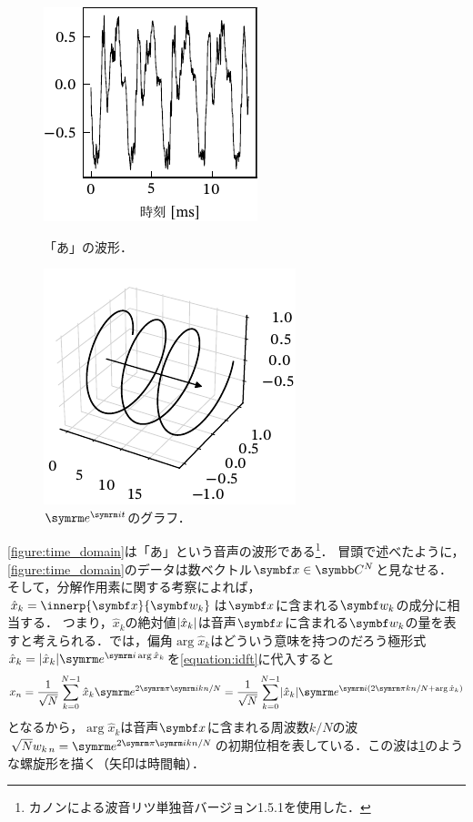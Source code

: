 \documentclass[../../main]{subfiles}
\begin{document}
\begin{figure}[htbp]
  \begin{minipage}{\linewidth/2}
    \centering
    \includegraphics{figures/time_domain.pdf}
    \caption{「あ」の波形．}
    \label{figure:time_domain}
  \end{minipage}%
  \begin{minipage}{\linewidth/2}
    \centering
    \includegraphics{figures/helix.pdf}
    \caption{\(\napr^{\iuni t}\)のグラフ．}
    \label{figure:complex_sinusoid}
  \end{minipage}
\end{figure}

\cref{figure:time_domain}は「あ」という音声の波形である\footnote{カノン\cite{canon}による波音リツ単独音バージョン1.5.1を使用した．}．
冒頭で述べたように，\cref{figure:time_domain}のデータは数ベクトル\(\vect{x}\in\numset{C}^N\)と見なせる．
そして，分解作用素に関する考察によれば，\(\hat{x}_k=\innerp{\vect{x}}{\vect{w}_k}\)は\(\vect{x}\)に含まれる\(\vect{w}_k\)の成分に相当する．
つまり，\(\hat{x}_k\)の絶対値\(\lvert\hat{x}_k\rvert\)は音声\(\vect{x}\)に含まれる\(\vect{w}_k\)の量を表すと考えられる．では，偏角\(\arg\hat{x}_k\)はどういう意味を持つのだろう\？極形式\(\hat{x}_k=\abs{\hat{x}_k}\napr^{\iuni\arg\hat{x}_k}\)を\cref{equation:idft}に代入すると
\[
  x_n = \frac{1}{\sqrt{N}}\sum_{k=0}^{N-1}\hat{x}_k\napr^{2\krez\iuni kn/N}
  = \frac{1}{\sqrt{N}}\sum_{k=0}^{N-1}\abs{\hat{x}_k}\napr^{\iuni(2\krez kn/N+\arg\hat{x}_k)}
\]
となるから，\(\arg\hat{x}_k\)は音声\(\vect{x}\)に含まれる周波数\(k/N\)の波\(\sqrt{N}\midx{w}{k}{n}=\napr^{2\krez\iuni kn/N}\)の初期位相を表している．この波は\cref{figure:complex_sinusoid}のような螺旋形を描く（矢印は時間軸）．
\end{document}
